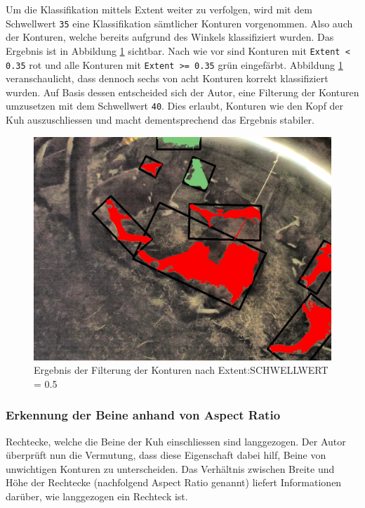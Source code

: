 Um die Klassifikation mittels Extent weiter zu verfolgen, wird mit dem Schwellwert \texttt{35} eine Klassifikation sämtlicher Konturen vorgenommen. Also auch der Konturen, welche bereits aufgrund des Winkels klassifiziert wurden. Das Ergebnis ist in Abbildung \ref{fig: Ergebnis der Filterung der Konturen nach Extent} sichtbar. Nach wie vor sind Konturen mit \texttt{Extent < 0.35} rot und alle Konturen mit \texttt{Extent >= 0.35} grün eingefärbt. Abbildung \ref{fig: Ergebnis der Filterung der Konturen nach Extent} veranschaulicht, dass dennoch sechs von acht Konturen korrekt klassifiziert wurden. Auf Basis dessen entscheided sich der Autor, eine Filterung der Konturen umzusetzen mit dem Schwellwert  \texttt{40}. Dies erlaubt, Konturen wie den Kopf der Kuh auszuschliessen und macht dementsprechend das Ergebnis stabiler.
\begin{figure}[H]
	\center
	\includegraphics[scale=0.43]{Grafiken/entwicklung/26FilteringExtent.jpg}
	\caption{Ergebnis der Filterung der Konturen nach Extent:SCHWELLWERT = 0.5 } 
	\label{fig: Ergebnis der Filterung der Konturen nach Extent} 
\end{figure}
\subsubsection{Erkennung der Beine anhand von Aspect Ratio}

Rechtecke, welche die Beine der Kuh einschliessen sind langgezogen. Der Autor überprüft nun die Vermutung, dass diese Eigenschaft dabei hilf, Beine von unwichtigen Konturen zu unterscheiden. Das Verhältnis zwischen Breite und Höhe der Rechtecke (nachfolgend Aspect Ratio genannt) liefert Informationen darüber, wie langgezogen ein Rechteck ist.	
	
